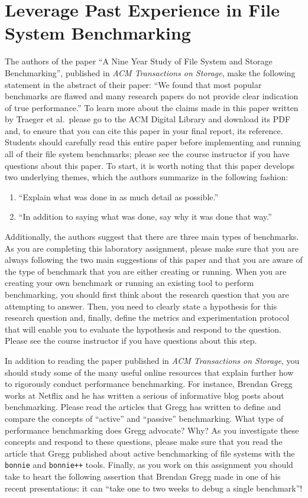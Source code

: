 \section*{Leverage Past Experience in File System Benchmarking}

The authors of the paper ``A Nine Year Study of File System and Storage Benchmarking'', published in {\em ACM
Transactions on Storage}, make the following statement in the abstract of their paper: ``We found that most popular
benchmarks are flawed and many research papers do not provide clear indication of true performance.'' To learn more
about the claims made in this paper written by Traeger et al.\ please go to the ACM Digital Library and download its PDF
and, to ensure that you can cite this paper in your final report, its  reference. Students should
carefully read this entire paper before implementing and running all of their file system benchmarks; please see the
course instructor if you have questions about this paper. To start, it is worth noting that this paper develops two
underlying themes, which the authors summarize in the following fashion:

\begin{enumerate}
  \itemsep 0in
  \item ``Explain what was done in as much detail as possible.''
  \item ``In addition to saying what was done, say why it was done that way.''
\end{enumerate}

Additionally, the authors suggest that there are three main types of benchmarks. As you are completing this laboratory
assignment, please make sure that you are always following the two main suggestions of this paper and that you are aware
of the type of benchmark that you are either creating or running. When you are creating your own benchmark or running an
existing tool to perform benchmarking, you should first think about the research question that you are attempting to
answer. Then, you need to clearly state a hypothesis for this research question and, finally, define the
metrics and experimentation protocol that will enable you to evaluate the hypothesis and respond to the question. Please
see the course instructor if you have questions about this step.

In addition to reading the paper published in {\em ACM Transactions on Storage}, you should study some of the many
useful online resources that explain further how to rigorously conduct performance benchmarking. For instance, Brendan
Gregg works at Netflix and he has written a serious of informative blog posts about benchmarking. Please read the
articles that Gregg has written to define and compare the concepts of ``active'' and ``passive'' benchmarking. What type
of performance benchmarking does Gregg advocate? Why? As you investigate these concepts and respond to these questions,
please make sure that you read the article that Gregg published about active benchmarking of file systems with the {\tt
  bonnie} and {\tt bonnie++} tools. Finally, as you work on this assignment you should take to heart the following
  assertion that Brendan Gregg made in one of his recent presentations: it can ``take one to two weeks to debug a single
  benchmark''!

